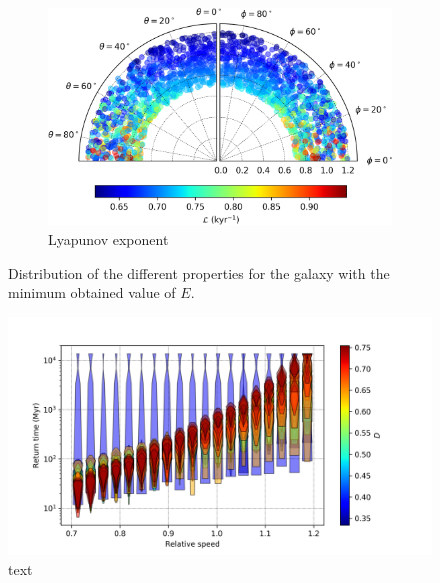 \begin{figure}[h]
\begin{subfigure}[t]{0.6\textwidth}
			\includegraphics[width=\textwidth]{"../Files/Week 13/smallerE_lyapunov"}
			\caption{Lyapunov exponent}
			\label{fig: smallerE_lyapunov}
		\end{subfigure}
		\caption{Distribution of the different properties for the galaxy with the minimum obtained value of $E$.}
		\label{fig: smallerE}
	\end{figure}

	\begin{figure}[h]
		\centering
		\includegraphics[width = 0.9\linewidth]{"../Files/Week 13/all_return"}
		\caption{text}
	\end{figure}

